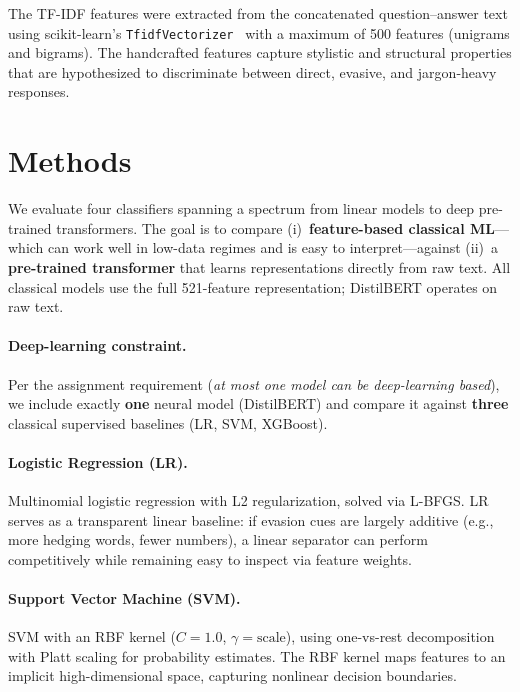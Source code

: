 \documentclass[12pt]{article}
\begin{document}
The TF-IDF features were extracted from the concatenated question--answer
text using scikit-learn's \texttt{TfidfVectorizer}~\cite{sklearn} with a
maximum of 500 features (unigrams and bigrams). The handcrafted features
capture stylistic and structural properties that are hypothesized to
discriminate between direct, evasive, and jargon-heavy responses.

\section{Methods}
\label{sec:methods}

We evaluate four classifiers spanning a spectrum from linear models to
deep pre-trained transformers. The goal is to compare (i)~\textbf{feature-based
classical ML}---which can work well in low-data regimes and is easy to
interpret---against (ii)~a \textbf{pre-trained transformer} that learns
representations directly from raw text. All classical models use the full
521-feature representation; DistilBERT operates on raw text.

\paragraph{Deep-learning constraint.}
Per the assignment requirement (\emph{at most one model can be deep-learning based}),
we include exactly \textbf{one} neural model (DistilBERT) and compare it against
\textbf{three} classical supervised baselines (LR, SVM, XGBoost).

\paragraph{Logistic Regression (LR).}
Multinomial logistic regression with L2 regularization, solved via L-BFGS.
LR serves as a transparent linear baseline: if evasion cues are largely
additive (e.g., more hedging words, fewer numbers), a linear separator can
perform competitively while remaining easy to inspect via feature weights.

\paragraph{Support Vector Machine (SVM).}
SVM with an RBF kernel ($C = 1.0$, $\gamma = \text{scale}$), using
one-vs-rest decomposition with Platt scaling for probability estimates.
The RBF kernel maps features to an implicit high-dimensional space,
capturing nonlinear decision boundaries.
\end{document}
